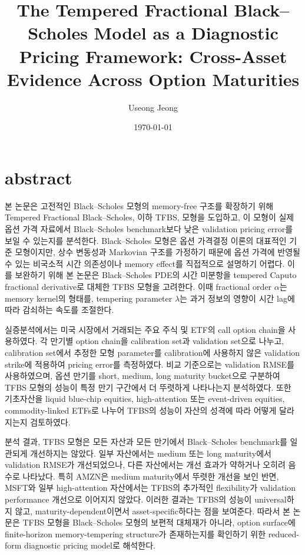 \documentclass[11pt,a4paper]{report}
\title{The Tempered Fractional Black–Scholes Model as a Diagnostic Pricing Framework: Cross-Asset Evidence Across Option Maturities}
\author{Useong Jeong}
\date{\today}
\begin{document}
\maketitle
\newpage

\chapter*{abstract}

본 논문은 고전적인 Black--Scholes 모형의 memory-free 구조를 확장하기 위해
Tempered Fractional Black--Scholes, 이하 TFBS, 모형을 도입하고,
이 모형이 실제 옵션 가격 자료에서 Black--Scholes benchmark보다 낮은
validation pricing error를 보일 수 있는지를 분석한다.
Black--Scholes 모형은 옵션 가격결정 이론의 대표적인 기준 모형이지만,
상수 변동성과 Markovian 구조를 가정하기 때문에 옵션 가격에 반영될 수 있는
비국소적 시간 의존성이나 memory effect를 직접적으로 설명하기 어렵다.
이를 보완하기 위해 본 논문은 Black--Scholes PDE의 시간 미분항을
tempered Caputo fractional derivative로 대체한 TFBS 모형을 고려한다.
이때 fractional order $\alpha$는 memory kernel의 형태를,
tempering parameter $\lambda$는 과거 정보의 영향이 시간 lag에 따라
감쇠하는 속도를 조절한다.

실증분석에서는 미국 시장에서 거래되는 주요 주식 및 ETF의 call option chain을
사용하였다. 각 만기별 option chain을 calibration set과 validation set으로 나누고,
calibration set에서 추정한 모형 parameter를 calibration에 사용하지 않은
validation strike에 적용하여 pricing error를 측정하였다.
비교 기준으로는 validation RMSE를 사용하였으며, 옵션 만기를 short, medium,
long maturity bucket으로 구분하여 TFBS 모형의 성능이 특정 만기 구간에서
더 뚜렷하게 나타나는지 분석하였다. 또한 기초자산을 liquid blue-chip equities,
high-attention 또는 event-driven equities, commodity-linked ETFs로 나누어
TFBS의 성능이 자산의 성격에 따라 어떻게 달라지는지 검토하였다.

분석 결과, TFBS 모형은 모든 자산과 모든 만기에서 Black--Scholes benchmark를
일관되게 개선하지는 않았다. 일부 자산에서는 medium 또는 long maturity에서
validation RMSE가 개선되었으나, 다른 자산에서는 개선 효과가 약하거나 오히려
음수로 나타났다. 특히 AMZN은 medium maturity에서 뚜렷한 개선을 보인 반면,
MSFT와 일부 high-attention 자산에서는 TFBS의 추가적인 flexibility가
validation performance 개선으로 이어지지 않았다. 이러한 결과는 TFBS의 성능이
universal하지 않고, maturity-dependent이면서 asset-specific하다는 점을 보여준다.
따라서 본 논문은 TFBS 모형을 Black--Scholes 모형의 보편적 대체재가 아니라,
option surface에 finite-horizon memory-tempering structure가 존재하는지를
확인하기 위한 reduced-form diagnostic pricing model로 해석한다.
\end{document}
